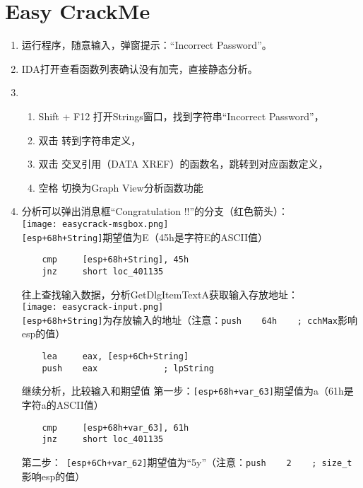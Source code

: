 \section{Easy CrackMe}
\begin{enumerate}
\item 运行程序，随意输入，弹窗提示：“Incorrect Password”。\\
\item IDA打开查看函数列表确认没有加壳，直接静态分析。\\
\item
	\begin{enumerate}
	\item Shift + F12  打开Strings窗口，找到字符串“Incorrect Password”，\\
	\item 双击 转到字符串定义，\\
	\item 双击 交叉引用（DATA XREF）的函数名，跳转到对应函数定义，\\
	\item 空格 切换为Graph View分析函数功能 \\
	\end{enumerate} 
\item 
	分析可以弹出消息框“Congratulation !!”的分支（红色箭头）：\\
	\texttt{[image: easycrack-msgbox.png]} \\
	\lstinline$[esp+68h+String]$期望值为E（45h是字符E的ASCII值）
	\begin{lstlisting}
	cmp     [esp+68h+String], 45h
	jnz     short loc_401135
	\end{lstlisting}
	往上查找输入数据，分析GetDlgItemTextA获取输入存放地址：\\
	\texttt{[image: easycrack-input.png]} \\
	\lstinline$[esp+68h+String]$为存放输入的地址（注意：\lstinline$push    64h    ; cchMax$影响esp的值）
	\begin{lstlisting}
	lea     eax, [esp+6Ch+String]
	push    eax             ; lpString
	\end{lstlisting}
	继续分析，比较输入和期望值
	第一步：\lstinline$[esp+68h+var_63]$期望值为a（61h是字符a的ASCII值）
	\begin{lstlisting}
	cmp     [esp+68h+var_63], 61h
	jnz     short loc_401135
	\end{lstlisting}
	第二步：\lstinline$ [esp+6Ch+var_62]$期望值为“5y”（注意：\lstinline$push    2    ; size_t$影响esp的值）
	\begin{lstlisting}

\end{lstlisting}
\end{enumerate}
